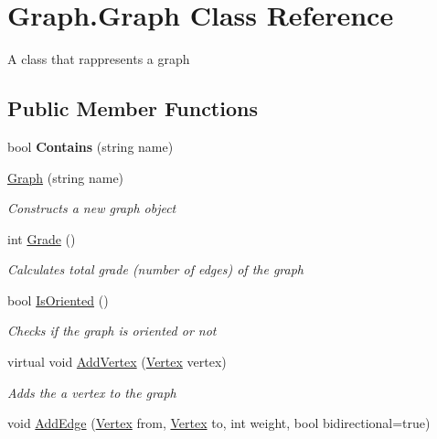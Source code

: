 \hypertarget{class_graph_1_1_graph}{}\section{Graph.\+Graph Class Reference}
\label{class_graph_1_1_graph}


A class that rappresents a graph  


\subsection*{Public Member Functions}
\begin{DoxyCompactItemize}
\item 
\mbox{\label{class_graph_1_1_graph_a5eaf7b1db5e23c8de15f5d3d5cc2ff54}} 
bool {\bfseries Contains} (string name)
\item 
\hyperlink{class_graph_1_1_graph_a30ae09ae4861f50e9e2b52d4e5628335}{Graph} (string name)
\begin{DoxyCompactList}\small\item\em Constructs a new graph object \end{DoxyCompactList}\item 
int \hyperlink{class_graph_1_1_graph_a1340be74165a617b2229a1ddb6acb9d2}{Grade} ()
\begin{DoxyCompactList}\small\item\em Calculates total grade (number of edges) of the graph \end{DoxyCompactList}\item 
bool \hyperlink{class_graph_1_1_graph_a7704d6b3b279e38356b1a3a75f1b4b92}{Is\+Oriented} ()
\begin{DoxyCompactList}\small\item\em Checks if the graph is oriented or not \end{DoxyCompactList}\item 
virtual void \hyperlink{class_graph_1_1_graph_aac26679440a896ed404021c777070345}{Add\+Vertex} (\hyperlink{class_graph_1_1_vertex}{Vertex} vertex)
\begin{DoxyCompactList}\small\item\em Adds the a vertex to the graph \end{DoxyCompactList}\item 
void \hyperlink{class_graph_1_1_graph_af597a3c28572462384f64ea244e41db6}{Add\+Edge} (\hyperlink{class_graph_1_1_vertex}{Vertex} from, \hyperlink{class_graph_1_1_vertex}{Vertex} to, int weight, bool bidirectional=true)

\end{DoxyCompactItemize}
